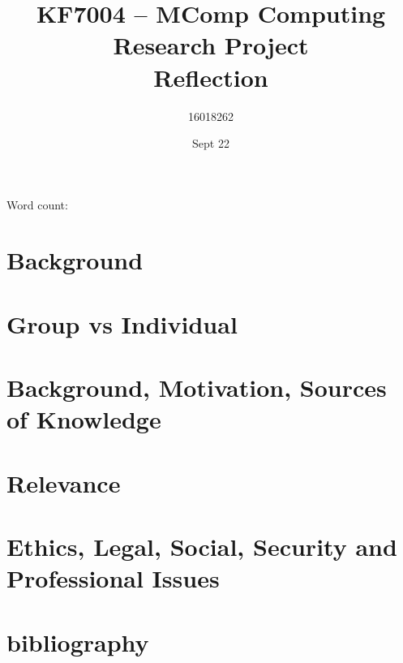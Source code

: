 \documentclass[10pt]{article}
\title{KF7004 – MComp Computing Research Project \\ Reflection}
\author{16018262}
\date{Sept 22}
\begin{document}
\maketitle
\begin{center}
	Word count: 
\end{center}
\tableofcontents
\section{Background}

\section{Group vs Individual}

\section{Background, Motivation, Sources of Knowledge}

\section{Relevance}

\section{Ethics, Legal, Social, Security and Professional Issues}

\section{bibliography}
\printbibliography
\appendix
\end{document}
